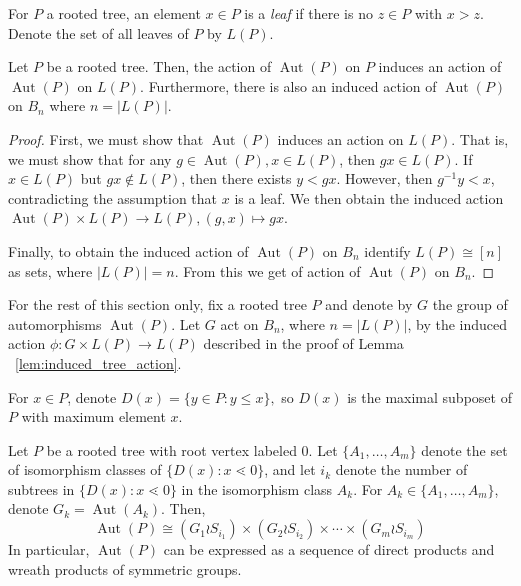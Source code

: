 \documentclass[smallextended, envcountsame, numbook]{svjour3}
\numberwithin{equation}{section}
\newcommand\Aut{\operatorname{Aut}}
\begin{document}
\begin{definition}
For $P$ a rooted tree, an element $x \in P$ is a {\it leaf} if there is no $z \in P$ with $x > z$. Denote the set of all leaves of $P$ by $L(P)$.
\end{definition}

\begin{lemma}
\label{lem:induced_tree_action}
Let $P$ be a rooted tree. Then, the action of $\Aut(P)$ on $P$ induces an action of $\Aut(P)$ on $L(P)$. Furthermore, there is also an induced action of $\Aut(P)$ on $B_n$ where $n = |L(P)|$. 
\end{lemma}
\begin{proof}
First, we must show that $\Aut(P)$ induces an action on $L(P)$. That is, we must show that for any $g \in \Aut(P),x \in L(P)$, then $gx \in L(P)$. If $x \in L(P)$ but $gx \notin L(P)$, then there exists $y < gx$. However, then $g^{-1}y < x$, contradicting the assumption that $x$ is a leaf. We then obtain the induced action $\Aut(P)\times L(P) \rightarrow L(P),(g,x)\mapsto gx$.

Finally, to obtain the induced action of $\Aut(P)$ on $B_n$ identify $L(P) \cong [n]$ as sets, where $|L(P)| = n$. From this we get of action of $\Aut(P)$ on $B_n$.
\end{proof}

For the rest of this section only, fix a rooted tree $P$ and denote by $G$ the group of automorphisms $\Aut(P)$. Let $G$ act on $B_n$, where $n = |L(P)|$, by the induced action $\phi\colon G \times L(P) \rightarrow L(P)$ described in the proof of Lemma ~\ref{lem:induced_tree_action}.

For $x \in P$, denote $D(x) = \{y \in P\colon y \leq x\},$ so $D(x)$ is the maximal subposet of $P$ with maximum element $x$.

\begin{proposition}
\label{prop:automorphism_trees}
Let $P$ be a rooted tree with root vertex labeled $0$. Let $\{A_1,\ldots,A_m\}$ denote the set of isomorphism classes of $\{D(x)\colon x\lessdot 0\}$, and let $i_k$ denote the number of subtrees in $\{D(x)\colon x\lessdot 0\}$ in the isomorphism class $A_k$. For $A_k \in \{A_1,\ldots,A_m\}$, denote $G_k = \Aut(A_k)$. Then, 
\begin{equation}
\label{eq:level_expansion}
\Aut(P) \cong (G_1 \wr S_{i_1}) \times (G_2 \wr S_{i_2}) \times \cdots \times (G_m\wr S_{i_m})
\end{equation}
In particular, $\Aut(P)$ can be expressed as a sequence of direct products and wreath products of symmetric groups.
\end{proposition}
\end{document}
